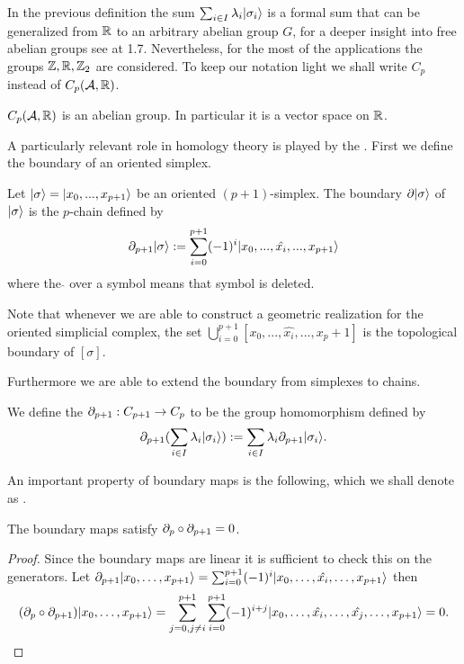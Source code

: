 \documentclass[../1.tex]{subfiles}
\begin{document}
    In the previous definition the sum $\sum_{i \in I} \lambda_i | \sigma_i \rangle$ is a formal sum that can be generalized from $\mathbb{R}$ to an arbitrary abelian group $G$, for a deeper insight into free abelian groups see \cite{lang} at 1.7.
    Nevertheless, for the most of the applications the groups $\mathbb{Z},\mathbb{R},\mathbb{Z}_2$ are considered. To keep our notation light we shall write $C_p$ instead of $C_p(\mathcal{A},\mathbb{R})$.
    
    \begin{prop}
        $C_p(\mathcal{A},\mathbb{R})$ is an abelian group.
        In particular it is a vector space on $\mathbb{R}$.
    \end{prop}

    A particularly relevant role in homology theory is played by the . First we define the boundary of an oriented simplex.

    \begin{defn}
        Let $| \sigma \rangle = | x_0,...,x_{p+1} \rangle$ be an oriented $(p+1)$-simplex. The boundary $\partial| \sigma \rangle$ of $| \sigma \rangle$ is the $p$-chain
        defined by \[ \partial_{p+1}| \sigma \rangle := \sum_{i = 0}^{p+1}(-1)^i| x_0,...,\hat{x_i},...,x_{p+1} \rangle\]
        where the  $\hat{}$  over a symbol means that symbol is deleted.
    \end{defn}

    \begin{rem}
        Note that whenever we are able to construct a geometric realization for the oriented simplicial complex, the set $\bigcup_{i = 0}^{p+1}[x_0,...,\hat{x_i},...,x_p+1]$
        is the topological boundary of $[\sigma]$.
    \end{rem}

    Furthermore we are able to extend the boundary from simplexes to chains.
    
    \begin{defn}
        We define the  $\partial_{p+1} : C_{p+1} \to C_p$ to be the group homomorphism defined by
        \[ \partial_{p+1}(\sum_{i \in I}\lambda_i| \sigma_i \rangle) := \sum_{i \in I}\lambda_i\partial_{p+1}| \sigma_i \rangle .\]
    \end{defn}

    An important property of boundary maps is the following, which we shall denote as .

    \begin{lem}
        The boundary maps satisfy $\partial_p \circ \partial_{p+1} = 0$.
    \end{lem}
    \begin{proof}
        Since the boundary maps are linear it is sufficient to check this on the generators.
        Let $\partial_{p+1}| x_0,\dots,x_{p+1} \rangle = \sum_{i=0}^{p+1} (-1)^i| x_0,\dots,\hat{x_i},\dots,x_{p+1} \rangle$ then 
        \[(\partial_p \circ \partial_{p+1})| x_0,\dots,x_{p+1} \rangle = \sum_{j=0, j \neq i}^{p+1} \sum_{i=0}^{p+1} (-1)^{i+j}| x_0,\dots,\hat{x_i},\dots,\hat{x_j},\dots,x_{p+1} \rangle = 0. \qedhere \]     
    \end{proof}
\end{document}
